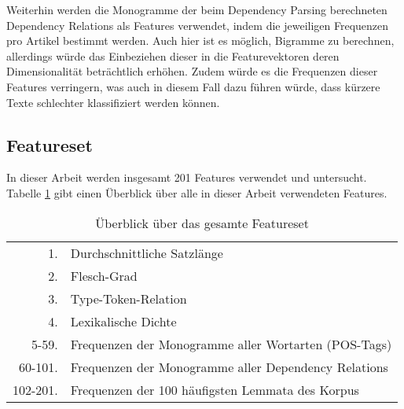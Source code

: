 Weiterhin werden die Monogramme der beim Dependency Parsing berechneten Dependency Relations als Features verwendet, indem die jeweiligen Frequenzen pro Artikel bestimmt werden. Auch hier ist es möglich, Bigramme zu berechnen, allerdings würde das Einbeziehen dieser in die Featurevektoren deren Dimensionalität beträchtlich erhöhen. Zudem würde es die Frequenzen dieser Features verringern, was auch in diesem Fall dazu führen würde, dass kürzere Texte schlechter klassifiziert werden können.

\clearpage
\subsection{Featureset}
In dieser Arbeit werden insgesamt 201 Features verwendet und untersucht. Tabelle \ref{table.allfeatures} gibt einen Überblick über alle in dieser Arbeit verwendeten Features.

\begin{table}[h]
\centering
\begin{spacing}{1.25}
\begin{tabular}{rl}
  1. & Durchschnittliche Satzlänge\\
  2. & Flesch-Grad\\
  3. & Type-Token-Relation\\
  4. & Lexikalische Dichte\\
  5-59. & Frequenzen der Monogramme aller Wortarten (POS-Tags)\\
  60-101. & Frequenzen der Monogramme aller Dependency Relations\\
  102-201. & Frequenzen der 100 häufigsten Lemmata des Korpus
\end{tabular}
\caption{Überblick über das gesamte Featureset}
\label{table.allfeatures}
\end{spacing}
\end{table}

